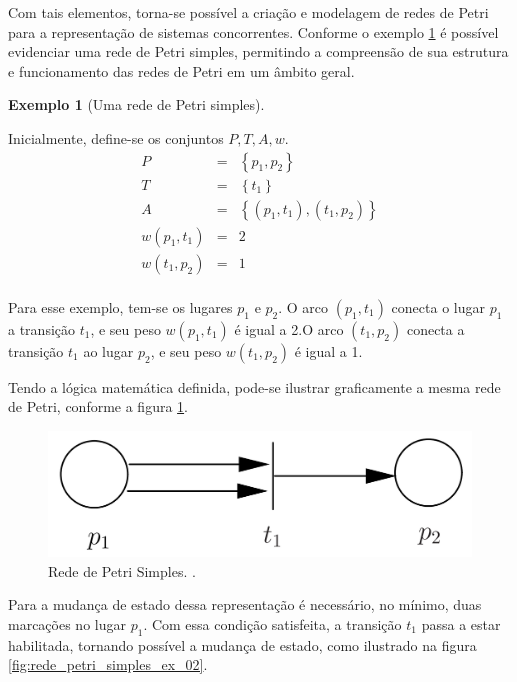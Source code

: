 \documentclass[
	12pt,				%
	openright,			%
	oneside,			%
	a4paper,			%
	english,			%
	brazil				%
	]{abntex2}
\newtheorem{exemplo}{Exemplo}
\begin{document}
Com tais elementos, torna-se possível a criação e modelagem de redes de Petri para a representação de sistemas concorrentes. Conforme o exemplo \ref{exemplo_rede_petri_simples} é possível evidenciar uma rede de Petri simples, permitindo a compreensão de sua estrutura e funcionamento das redes de Petri em um âmbito geral.

\begin{exemplo}[Uma rede de Petri simples] \label{exemplo_rede_petri_simples} 
\end{exemplo}
Inicialmente, define-se os conjuntos $P, T, A, w$. 
\begin{eqnarray*}
P &=& \left \{ p_{1},p_{2}\right \} \\
T &=& \left \{ t_{1}\right \} \\
A &=& \left \{ \left (p_{1},t_{1}\right ),\left (t_{1},p_{2}\right ) \right \} \\
w\left ( p_{1},t_{1} \right ) &=& 2 \\
w\left ( t_{1},p_{2} \right ) &=& 1 \\
\end{eqnarray*}


Para esse exemplo, tem-se os lugares $p_{1}$ e $p_{2}$. O arco $\left ( p_{1},t_{1} \right )$ conecta o lugar $p_{1}$ a transição $t_{1}$, e seu peso $w\left ( p_{1},t_{1} \right )$ é igual a 2.O arco $\left ( t_{1},p_{2} \right )$ conecta a transição  $t_{1}$ ao lugar $p_{2}$, e seu peso $w\left ( t_{1},p_{2} \right )$ é igual a 1. 

Tendo a lógica matemática definida, pode-se ilustrar graficamente a mesma rede de Petri, conforme a figura \ref{fig:rede_petri_simples_ex_01}.

\begin{figure}[ht] 
	\centering
	\includegraphics[scale=0.3]{exemplo_simples_rede_petri.png}
	\caption[Rede de Petri Simples]{Rede de Petri Simples. \textcite{CassandrasLafortune08}.}
	\label{fig:rede_petri_simples_ex_01}
\end{figure} 

Para a mudança de estado dessa representação é necessário, no mínimo, duas marcações no lugar $p_{1}$. Com essa condição satisfeita, a transição $t_{1}$ passa a estar habilitada, tornando possível a mudança de estado, como ilustrado na figura \ref{fig:rede_petri_simples_ex_02}.
\end{document}
